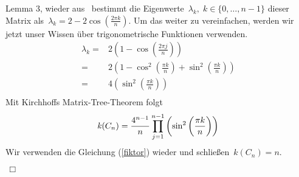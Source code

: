 Lemma 3, wieder aus~\cite{daoud_2014} bestimmt die Eigenwerte $\,\lambda_k,\; k \in \{0,\ldots,n-1\}$
dieser Matrix als $\,\lambda_k = 2-2\cos {\left(\frac{2\pi k}{n}\right)}$.\; 
Um das weiter zu vereinfachen, werden wir jetzt unser Wissen über trigonometrische Funktionen verwenden.
\begin{equation}
\begin{split}
 \lambda_k={} & 2 \left(1-\cos \left(\frac{2\pi j}{n}\right)\right)\\
 = {}&2 \left( 1 - \cos^2\left(\frac{\pi k}{n}\right)+\sin^2\left(\frac{\pi k}{n}\right) \right)\\
 = {}& 4 \left(\sin^2\left(\frac{\pi k}{n}\right) \right)\\
\end{split}
\label{ewc}
\end{equation}
Mit Kirchhoffs Matrix-Tree-Theorem folgt
\begin{equation*}
 \mathit{k}(C_n)=\frac{4^{n-1}}{n}\prod_{j=1}^{n-1} \left(\sin^2\left(\frac{\pi k}{n}\right) \right)\\
\end{equation*}
Wir verwenden die Gleichung (\ref{fiktor}) wieder und schließen $\,\mathit{k}(C_n)=n$.\; 
\begin{flushright} $\,\Box\,$ \end{flushright} 
